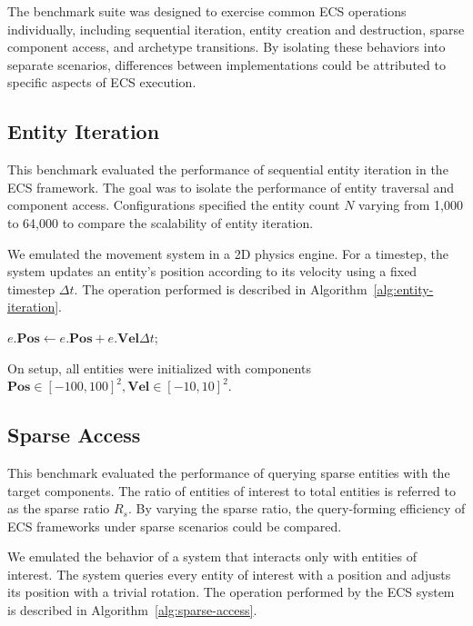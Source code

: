 \documentclass[conference]{IEEEtran}
\begin{document}
    The benchmark suite was designed to exercise common ECS operations individually,
    including sequential iteration, entity creation and destruction, sparse component
    access, and archetype transitions.
    By isolating these behaviors into separate
    scenarios, differences between implementations could be attributed to specific
    aspects of ECS execution.

    \subsection{Entity Iteration}
    \label{subsec:entity-iteration}

    This benchmark evaluated the performance of sequential entity iteration in the
    ECS framework.
    The goal was to isolate the performance of entity traversal and
    component access.
    Configurations specified the entity count $N$ varying from 1,000 to 64,000 to compare the scalability of entity iteration.

    We emulated the movement system in a 2D physics engine.
    For a timestep, the system updates an entity's position according to its velocity using a fixed timestep $\Delta t$.
    The operation performed is described in Algorithm~\ref{alg:entity-iteration}.

    \begin{algorithm}[htbp]
        \caption{Entity Iteration}
        \label{alg:entity-iteration}
        {
            $e.\mathbf{Pos} \gets e.\mathbf{Pos} + e.\mathbf{Vel}\Delta t$;
        }
    \end{algorithm}

    On setup, all entities were initialized with components $\mathbf{Pos} \in [-100,100]^2, \mathbf{Vel} \in [-10,10]^2$.

    \subsection{Sparse Access}
    \label{subsec:sparse-access}

    This benchmark evaluated the performance of querying sparse entities with the target components.
    The ratio of entities of interest to total entities is referred to as the sparse ratio $R_s$.
    By varying the sparse ratio, the query-forming efficiency of ECS frameworks under sparse scenarios could be compared.

    We emulated the behavior of a system that interacts only with entities of interest.
    The system queries every entity of interest with a position and adjusts its position with a trivial rotation.
    The operation performed by the ECS system is described in
    Algorithm~\ref{alg:sparse-access}.
\end{document}
